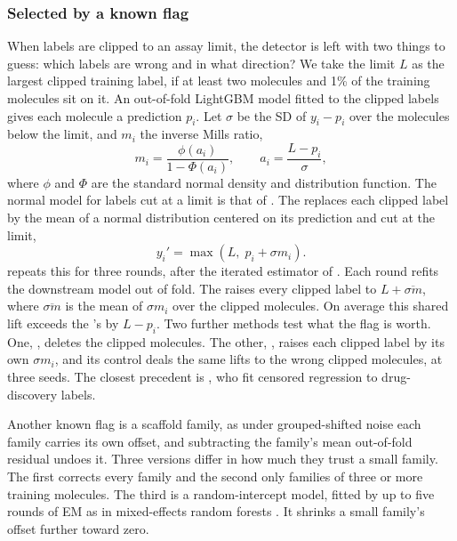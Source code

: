 \subsubsection{Selected by a known flag}\label{sec:noise:censoring}
When labels are clipped to an assay limit, the detector is left with two things to guess: which labels are wrong and in what direction? We take the limit $L$ as the largest clipped training label, if at least two molecules and 1\% of the training molecules sit on it. An out-of-fold LightGBM model fitted to the clipped labels gives each molecule a prediction $p_i$. Let $\sigma$ be the SD of $y_i - p_i$ over the molecules below the limit, and $m_i$ the inverse Mills ratio,
\begin{equation}
m_i = \frac{\phi(a_i)}{1 - \Phi(a_i)}, \qquad a_i = \frac{L - p_i}{\sigma},
\end{equation}
where $\phi$ and $\Phi$ are the standard normal density and distribution function. The normal model for labels cut at a limit is that of \citet{Tobin1958}. The  replaces each clipped label by the mean of a normal distribution centered on its prediction and cut at the limit,
\begin{equation}
y_i' = \max\!\left(L,\; p_i + \sigma m_i\right).
\label{eq:noise:truncated}
\end{equation}
 repeats this for three rounds, after the iterated estimator of \citet{buckley1979linear}. Each round refits the downstream model out of fold. The  raises every clipped label to $L + \overline{\sigma m}$, where $\overline{\sigma m}$ is the mean of $\sigma m_i$ over the clipped molecules. On average this shared lift exceeds the 's by $L - p_i$. Two further methods test what the flag is worth. One, , deletes the clipped molecules. The other, , raises each clipped label by its own $\sigma m_i$, and its control deals the same lifts to the wrong clipped molecules, at three seeds. The closest precedent is \citet{Svensson2025}, who fit censored regression to drug-discovery labels.

Another known flag is a scaffold family, as under grouped-shifted noise each family carries its own offset, and subtracting the family's mean out-of-fold residual undoes it. Three versions differ in how much they trust a small family. The first corrects every family and the second only families of three or more training molecules. The third is a random-intercept model, fitted by up to five rounds of EM as in mixed-effects random forests \citep{hajjem2014mixed, sigrist2022gaussian}. It shrinks a small family's offset further toward zero.


